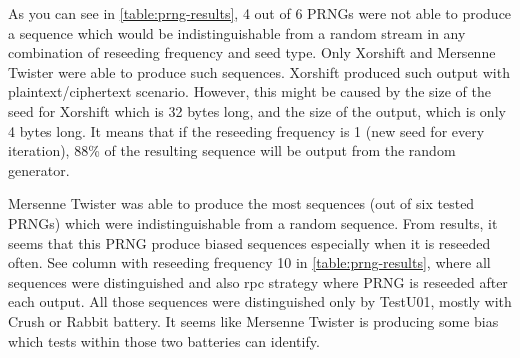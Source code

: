 \documentclass[
    digital,    %
    oneside,    %
    color,
    11pt,
    nocover,
    notable,
    nolof,
    nolot,
    final
]{fithesis3}
\renewcommand\_{\textunderscore\allowbreak}
\begin{document}
As you can see in \cref{table:prng-results}, 4 out of 6 PRNGs were not able to produce a sequence which would be indistinguishable from a random stream in any combination of reseeding frequency and seed type. Only Xorshift and Mersenne Twister were able to produce such sequences. Xorshift produced such output with plaintext/ciphertext scenario. However, this might be caused by the size of the seed for Xorshift which is 32 bytes long, and the size of the output, which is only 4 bytes long. It means that if the reseeding frequency is 1 (new seed for every iteration), 88\% of the resulting sequence will be output from the random generator.

Mersenne Twister was able to produce the most sequences (out of six tested PRNGs) which were indistinguishable from a random sequence. From results, it seems that this PRNG produce biased sequences especially when it is reseeded often. See column with reseeding frequency 10 in  \cref{table:prng-results}, where all sequences were distinguished and also rpc strategy where PRNG is reseeded after each output. All those sequences were distinguished only by TestU01, mostly with Crush or Rabbit battery. It seems like Mersenne Twister is producing some bias which tests within those two batteries can identify.
\end{document}

